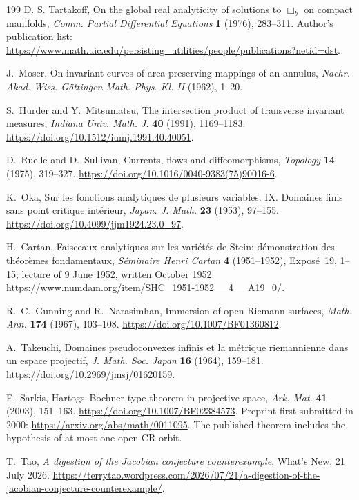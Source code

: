 \documentclass[11pt,reqno]{amsart}
\theoremstyle{definition}
\theoremstyle{remark}
\begin{document}
\begin{thebibliography}{199}
 D. S. Tartakoff, On the global real analyticity of solutions to $\Box_b$ on compact manifolds, \emph{Comm. Partial Differential Equations} \textbf{1} (1976), 283--311. Author's publication list: \url{https://www.math.uic.edu/persisting_utilities/people/publications?netid=dst}.

 J.~Moser, On invariant curves of area-preserving mappings of an annulus, \emph{Nachr. Akad. Wiss. G\"ottingen Math.-Phys. Kl. II} (1962), 1--20.

 S.~Hurder and Y.~Mitsumatsu, The intersection product of transverse invariant measures, \emph{Indiana Univ. Math. J.} \textbf{40} (1991), 1169--1183. \url{https://doi.org/10.1512/iumj.1991.40.40051}.

 D.~Ruelle and D.~Sullivan, Currents, flows and diffeomorphisms, \emph{Topology} \textbf{14} (1975), 319--327. \url{https://doi.org/10.1016/0040-9383(75)90016-6}.

 K.~Oka, Sur les fonctions analytiques de plusieurs variables. IX. Domaines finis sans point critique int\'erieur, \emph{Japan. J. Math.} \textbf{23} (1953), 97--155. \url{https://doi.org/10.4099/jjm1924.23.0_97}.

 H.~Cartan, Faisceaux analytiques sur les vari\'et\'es de Stein: d\'emonstration des th\'eor\`emes fondamentaux, \emph{S\'eminaire Henri Cartan} \textbf{4} (1951--1952), Expos\'e~19, 1--15; lecture of 9 June 1952, written October 1952. \url{https://www.numdam.org/item/SHC_1951-1952__4__A19_0/}.

 R.~C.~Gunning and R.~Narasimhan, Immersion of open Riemann surfaces, \emph{Math. Ann.} \textbf{174} (1967), 103--108. \url{https://doi.org/10.1007/BF01360812}.

 A.~Takeuchi, Domaines pseudoconvexes infinis et la m\'etrique riemannienne dans un espace projectif, \emph{J. Math. Soc. Japan} \textbf{16} (1964), 159--181. \url{https://doi.org/10.2969/jmsj/01620159}.

 F.~Sarkis, Hartogs--Bochner type theorem in projective space, \emph{Ark. Mat.} \textbf{41} (2003), 151--163. \url{https://doi.org/10.1007/BF02384573}. Preprint first submitted in 2000: \url{https://arxiv.org/abs/math/0011095}. The published theorem includes the hypothesis of at most one open CR orbit.

 T.~Tao, \emph{A digestion of the Jacobian conjecture counterexample}, What's New, 21 July 2026. \url{https://terrytao.wordpress.com/2026/07/21/a-digestion-of-the-jacobian-conjecture-counterexample/}.


\end{thebibliography}
\end{document}
